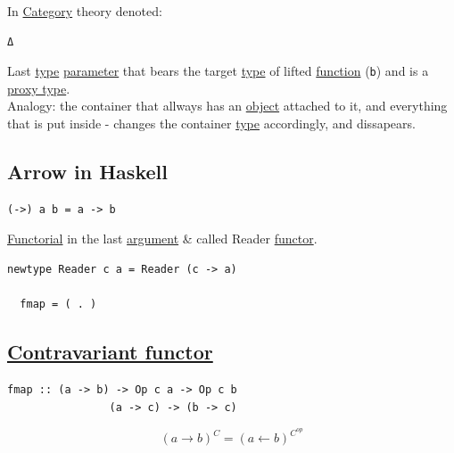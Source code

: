 \documentclass[11pt]{article}
\begin{document}
In \hyperref[org3e3a79b]{Category} theory denoted:\\
\begin{verbatim}
Δ
\end{verbatim}

Last \hyperref[org4fbaeb8]{type} \hyperref[org45d4a16]{parameter} that bears the target \hyperref[org4fbaeb8]{type} of lifted \hyperref[orgeb5cddb]{function} (\texttt{b}) and is a \hyperref[org33659fe]{proxy type}.\\

Analogy: the container that allways has an \hyperref[org025aac8]{object} attached to it, and everything that is put inside - changes the container \hyperref[org4fbaeb8]{type} accordingly, and dissapears.\\

\subsection{\label{org426f4fa}Arrow in Haskell}
\label{sec:org8cf94fb}

\begin{verbatim}
(->) a b = a -> b
\end{verbatim}
\hyperref[org8ac5764]{Functorial} in the last \hyperref[orgf66a5f7]{argument} \& called Reader \hyperref[org6073683]{functor}.\\

\begin{verbatim}
newtype Reader c a = Reader (c -> a)

  fmap = ( . )
\end{verbatim}

\subsection{\hyperref[org4f18281]{Contravariant functor}}
\label{sec:org8c7842a}

\begin{verbatim}
fmap :: (a -> b) -> Op c a -> Op c b
                (a -> c) -> (b -> c)
\end{verbatim}


$$ (a \to b)^{C} = (a \leftarrow b)^{C^{op}} $$\\
\end{document}
